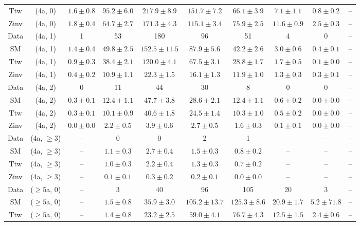 \begin{table}[h!]
{\begin{tabular}{cccccccccc}
	Ttw & (4a, 0) & $1.6\pm 0.8$ & $95.2\pm 6.0$ & $217.9\pm 8.9$ & $151.7\pm 7.2$ & $66.1\pm 3.9$ & $7.1\pm 1.1$ & $0.8\pm 0.2$ & -- \\[0.5ex] 
	Zinv & (4a, 0) & $1.8\pm 0.4$ & $64.7\pm 2.7$ & $171.3\pm 4.3$ & $115.1\pm 3.4$ & $75.9\pm 2.5$ & $11.6\pm 0.9$ & $2.5\pm 0.3$ & -- \\[0.5ex] 
	Data & (4a, 1) & 1 & 53 & 180 & 96 & 51 & 4 & 0 & -- \\[0.5ex] 
	SM & (4a, 1) & $1.4\pm 0.4$ & $49.8\pm 2.5$ & $152.5\pm 11.5$ & $87.9\pm 5.6$ & $42.2\pm 2.6$ & $3.0\pm 0.6$ & $0.4\pm 0.1$ & -- \\[0.5ex] 
	Ttw & (4a, 1) & $0.9\pm 0.3$ & $38.4\pm 2.1$ & $120.0\pm 4.1$ & $67.5\pm 3.1$ & $28.8\pm 1.7$ & $1.7\pm 0.5$ & $0.1\pm 0.0$ & -- \\[0.5ex] 
	Zinv & (4a, 1) & $0.4\pm 0.2$ & $10.9\pm 1.1$ & $22.3\pm 1.5$ & $16.1\pm 1.3$ & $11.9\pm 1.0$ & $1.3\pm 0.3$ & $0.3\pm 0.1$ & -- \\[0.5ex] 
	Data & (4a, 2) & 0 & 11 & 44 & 30 & 8 & 0 & 0 & -- \\[0.5ex] 
	SM & (4a, 2) & $0.3\pm 0.1$ & $12.4\pm 1.1$ & $47.7\pm 3.8$ & $28.6\pm 2.1$ & $12.4\pm 1.1$ & $0.6\pm 0.2$ & $0.0\pm 0.0$ & -- \\[0.5ex] 
	Ttw & (4a, 2) & $0.3\pm 0.1$ & $10.1\pm 0.9$ & $40.6\pm 1.8$ & $24.5\pm 1.4$ & $10.3\pm 1.0$ & $0.5\pm 0.2$ & $0.0\pm 0.0$ & -- \\[0.5ex] 
	Zinv & (4a, 2) & $0.0\pm 0.0$ & $2.2\pm 0.5$ & $3.9\pm 0.6$ & $2.7\pm 0.5$ & $1.6\pm 0.3$ & $0.1\pm 0.1$ & $0.0\pm 0.0$ & -- \\[0.5ex] 
	Data & (4a, $\ge3$) & -- & 0 & 0 & 2 & 1 & -- & -- & -- \\[0.5ex] 
	SM & (4a, $\ge3$) & -- & $1.1\pm 0.3$ & $2.7\pm 0.4$ & $1.5\pm 0.3$ & $0.8\pm 0.2$ & -- & -- & -- \\[0.5ex] 
	Ttw & (4a, $\ge3$) & -- & $1.0\pm 0.3$ & $2.2\pm 0.4$ & $1.3\pm 0.3$ & $0.7\pm 0.2$ & -- & -- & -- \\[0.5ex] 
	Zinv & (4a, $\ge3$) & -- & $0.1\pm 0.1$ & $0.3\pm 0.2$ & $0.2\pm 0.1$ & $0.0\pm 0.0$ & -- & -- & -- \\[0.5ex] 
	Data & ($\ge5$a, 0) & -- & 3 & 40 & 96 & 105 & 20 & 3 & -- \\[0.5ex] 
	SM & ($\ge5$a, 0) & -- & $1.5\pm 0.8$ & $35.9\pm 3.0$ & $105.2\pm 13.7$ & $125.3\pm 8.6$ & $20.9\pm 1.7$ & $5.2\pm 71.8$ & -- \\[0.5ex] 
	Ttw & ($\ge5$a, 0) & -- & $1.4\pm 0.8$ & $23.2\pm 2.5$ & $59.0\pm 4.1$ & $76.7\pm 4.3$ & $12.5\pm 1.5$ & $2.4\pm 0.6$ & -- \\[0.5ex] 

\end{tabular}}
\end{table}
